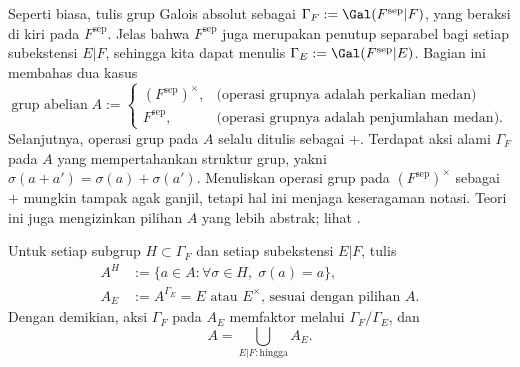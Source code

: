 Seperti biasa, tulis grup Galois absolut sebagai $\Gamma_F := \Gal(F^\text{sep}|F)$, yang beraksi di kiri pada $F^\text{sep}$. Jelas bahwa $F^\text{sep}$ juga merupakan penutup separabel bagi setiap subekstensi $E|F$, sehingga kita dapat menulis $\Gamma_E := \Gal(F^\text{sep}|E)$. Bagian ini membahas dua kasus
\begin{equation}\label{eqn:Kummer-A}
	\text{grup abelian}\; A := \begin{cases}
		(F^\text{sep})^\times, & \text{(operasi grupnya adalah perkalian medan)} \\
		F^\text{sep}, & \text{(operasi grupnya adalah penjumlahan medan)}.
\end{cases}\end{equation}
Selanjutnya, operasi grup pada $A$ selalu ditulis sebagai $+$. Terdapat aksi alami $\Gamma_F$ pada $A$ yang mempertahankan struktur grup, yakni $\sigma(a+a') = \sigma(a)+\sigma(a')$. Menuliskan operasi grup pada $(F^\text{sep})^\times$ sebagai $+$ mungkin tampak agak ganjil, tetapi hal ini menjaga keseragaman notasi. Teori ini juga mengizinkan pilihan $A$ yang lebih abstrak; lihat \cite[IV.3]{Neu99}.

Untuk setiap subgrup $H \subset \Gamma_F$ dan setiap subekstensi $E|F$, tulis
\begin{align*}
	A^H & := \{a \in A: \forall \sigma \in H, \; \sigma(a)=a \}, \\
	A_E & := A^{\Gamma_E} = \text{$E$ atau $E^\times$, sesuai dengan pilihan $A$.}
\end{align*}
Dengan demikian, aksi $\Gamma_F$ pada $A_E$ memfaktor melalui $\Gamma_F/\Gamma_E$, dan
\begin{equation}\label{eqn:Kummer-smoothness}
	A = \bigcup_{E|F: \text{hingga}} A_E.
\end{equation}


